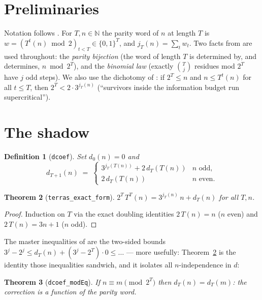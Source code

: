 \documentclass[11pt]{article}
\newtheorem{theorem}{Theorem}[section]
\newtheorem{definition}[theorem]{Definition}
\newcommand{\N}{\mathbb{N}}
\newcommand{\code}[1]{\texttt{#1}}
\newcommand{\jodd}[2]{j_{#1}(#2)}
\begin{document}
\section{Preliminaries}

Notation follows \cite{companion}. For $T, n \in \N$ the parity word of
$n$ at length $T$ is $w = (T^t(n) \bmod 2)_{t < T} \in \{0,1\}^T$, and
$\jodd{T}{n} = \sum_t w_t$. Two facts from \cite{companion} are used
throughout: the \emph{parity bijection} (the word of length $T$ is
determined by, and determines, $n \bmod 2^T$), and the \emph{binomial
law} (exactly $\binom{T}{j}$ residues mod $2^T$ have $j$ odd steps).
We also use the dichotomy of \cite{companion}: if $2^T \le n$ and
$n \le T^t(n)$ for all $t \le T$, then $2^T < 2 \cdot 3^{\jodd{T}{n}}$
(``survivors inside the information budget run supercritical'').

\section{The shadow}\label{sec:shadow}

\begin{definition}[\code{dcoef}]
Set $d_0(n) = 0$ and
\[
d_{T+1}(n) \;=\;
\begin{cases}
3^{\jodd{T}{T(n)}} + 2\, d_T(T(n)) & n \text{ odd},\\[2pt]
2\, d_T(T(n)) & n \text{ even}.
\end{cases}
\]
\end{definition}

\begin{theorem}[\code{terras\_exact\_form}]\label{thm:exact}
$2^T\, T^T(n) = 3^{\jodd{T}{n}}\, n + d_T(n)$ for all $T, n$.
\end{theorem}

\begin{proof}
Induction on $T$ via the exact doubling identities
$2\,T(n) = n$ ($n$ even) and $2\,T(n) = 3n+1$ ($n$ odd).
\end{proof}

The master inequalities of \cite{companion} are the two-sided bounds
$3^j - 2^j \le d_T(n) + (3^j - 2^T) \cdot 0 \le \ldots$ --- more
usefully: Theorem~\ref{thm:exact} is the identity those inequalities
sandwich, and it isolates all $n$-independence in $d$:

\begin{theorem}[\code{dcoef\_modEq}]\label{thm:dword}
If $n \equiv m \pmod{2^T}$ then $d_T(n) = d_T(m)$: the correction is a
function of the parity word.
\end{theorem}
\end{document}
